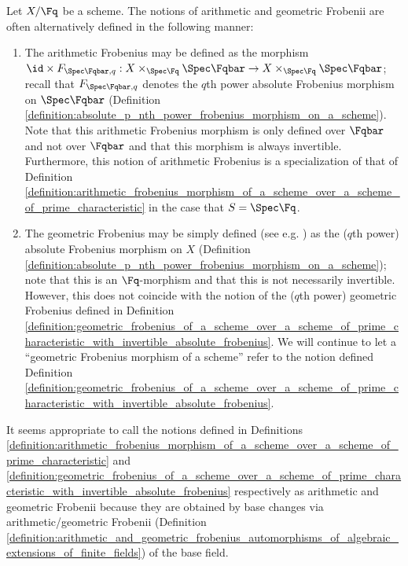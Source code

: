 \begin{remark}
    Let $X/\Fq$ be a scheme. The notions of arithmetic and geometric Frobenii are often alternatively defined in the following manner:    

    \begin{enumerate}

        \item The arithmetic Frobenius may be defined as the morphism $\id \times F_{\Spec \Fqbar, q}: X \times_{\Spec \Fq} \Spec \Fqbar \to X \times_{\Spec \Fq} \Spec \Fqbar$; recall that $F_{\Spec \Fqbar, q}$ denotes the $q$th power absolute Frobenius morphism on $\Spec \Fqbar$ (Definition \ref{definition:absolute_p_nth_power_frobenius_morphism_on_a_scheme}). Note that this arithmetic Frobenius morphism is only defined over $\Fqbar$ and not over $\Fqbar$ and that this morphism is always invertible. Furthermore, this notion of arithmetic Frobenius is a specialization of that of Definition \ref{definition:arithmetic_frobenius_morphism_of_a_scheme_over_a_scheme_of_prime_characteristic} in the case that $S = \Spec \Fq$.

        \item The geometric Frobenius may be simply defined (see e.g. \cite[Tag 03SQ]{stacks-project}) as the ($q$th power) absolute Frobenius morphism on $X$ (Definition \ref{definition:absolute_p_nth_power_frobenius_morphism_on_a_scheme}); note that this is an $\Fq$-morphism and that this is not necessarily invertible. However, this does not coincide with the notion of the ($q$th power) geometric Frobenius defined in Definition \ref{definition:geometric_frobenius_of_a_scheme_over_a_scheme_of_prime_characteristic_with_invertible_absolute_frobenius}. We will continue to let a ``geometric Frobenius morphism of a scheme'' refer to the notion defined Definition \ref{definition:geometric_frobenius_of_a_scheme_over_a_scheme_of_prime_characteristic_with_invertible_absolute_frobenius}.

    \end{enumerate}
It seems appropriate to call the notions defined in Definitions \ref{definition:arithmetic_frobenius_morphism_of_a_scheme_over_a_scheme_of_prime_characteristic} and \ref{definition:geometric_frobenius_of_a_scheme_over_a_scheme_of_prime_characteristic_with_invertible_absolute_frobenius} respectively as arithmetic and geometric Frobenii because they are obtained by base changes via arithmetic/geometric Frobenii (Definition \ref{definition:arithmetic_and_geometric_frobenius_automorphisms_of_algebraic_extensions_of_finite_fields}) of the base field.

\end{remark}

